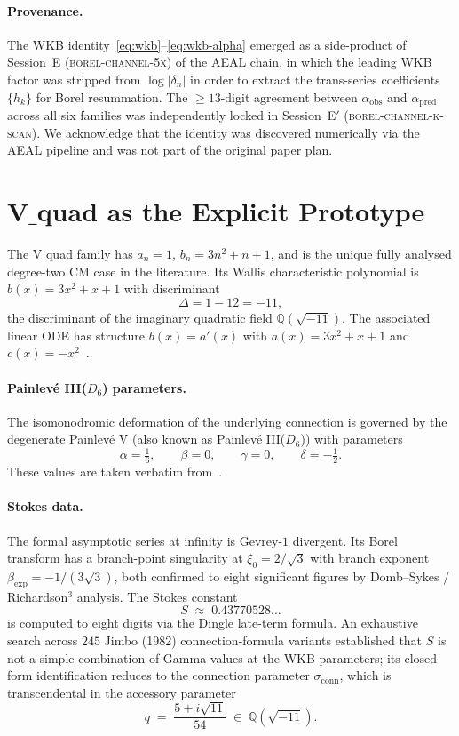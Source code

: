 \documentclass[12pt]{amsart}
\theoremstyle{definition}
\begin{document}
\paragraph{Provenance.}
The WKB identity~\eqref{eq:wkb}--\eqref{eq:wkb-alpha} emerged as a
side-product of Session~E (\textsc{borel-channel-5x}) of the AEAL
chain, in which the leading WKB factor was stripped from
$\log|\delta_{n}|$ in order to extract the trans-series coefficients
$\{h_{k}\}$ for Borel resummation. The $\ge 13$-digit agreement
between $\alpha_{\mathrm{obs}}$ and $\alpha_{\mathrm{pred}}$ across
all six families was independently locked in Session~E$'$
(\textsc{borel-channel-k-scan}). We acknowledge that the identity
was discovered numerically via the AEAL pipeline and was not part of
the original paper plan.

\section{V$\_$quad as the Explicit Prototype}\label{sec:vquad}

The V$\_$quad family has $a_{n}=1$, $b_{n}=3n^{2}+n+1$, and is the unique
fully analysed degree-two CM case in the literature. Its Wallis
characteristic polynomial is $b(x)=3x^{2}+x+1$ with discriminant
\[
\Delta=1-12=-11,
\]
the discriminant of the imaginary quadratic field $\mathbb{Q}(\sqrt{-11})$.
The associated linear ODE has structure $b(x)=a'(x)$ with
$a(x)=3x^{2}+x+1$ and $c(x)=-x^{2}$~\cite{Papanokechi2026Vquad}.

\paragraph{Painlev\'e III($D_{6}$) parameters.}
The isomonodromic deformation of the underlying connection is governed
by the degenerate Painlev\'e V (also known as Painlev\'e III($D_{6}$)) with
parameters
\[
\alpha=\tfrac{1}{6},\qquad \beta=0,\qquad \gamma=0,\qquad \delta=-\tfrac{1}{2}.
\]
These values are taken verbatim from~\cite[\S 2]{Papanokechi2026Vquad}.

\paragraph{Stokes data.}
The formal asymptotic series at infinity is Gevrey-$1$ divergent. Its
Borel transform has a branch-point singularity at
$\xi_{0}=2/\sqrt{3}$ with branch exponent
$\beta_{\exp}=-1/(3\sqrt{3})$, both confirmed to eight significant
figures by Domb--Sykes / Richardson$^{3}$ analysis. The Stokes constant
\[
S\;\approx\; 0.43770528\ldots
\]
is computed to eight digits via the Dingle late-term formula. An
exhaustive search across $245$ Jimbo (1982) connection-formula variants
established that $S$ is not a simple combination of Gamma values at the
WKB parameters; its closed-form identification reduces to the connection
parameter $\sigma_{\mathrm{conn}}$, which is transcendental in the
accessory parameter
\[
q\;=\;\frac{5+i\sqrt{11}}{54}\;\in\;\mathbb{Q}(\sqrt{-11}).
\]
\end{document}
